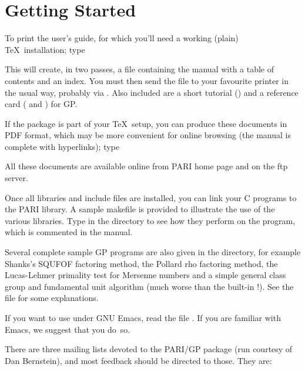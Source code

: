 \section{Getting Started}

 To print the user's guide, for which you'll
need a working (plain) \TeX\ installation; type


\noindent This will create, in two passes, a file 
containing the manual with a table of contents and an index. You must then
send the  file to your favourite printer in the usual way,
probably via . Also included are a short tutorial
() and a reference card (
and ) for GP.

\noindent If the  package is part of your \TeX\ setup, you can
produce these documents in PDF format, which may be more convenient for
online browsing (the manual is complete with hyperlinks); type


\noindent All these documents are available online from PARI home page and on
the  ftp server.

 Once all libraries and include files are installed,
you can link your C programs to the PARI library. A sample makefile
 is provided to illustrate the use of the various
libraries. Type  in the  directory to see how
they perform on the  program, which is commented in the
manual.

 Several complete sample GP programs are also given in
the  directory, for example Shanks's SQUFOF factoring method,
the Pollard rho factoring method, the Lucas-Lehmer primality test for
Mersenne numbers and a simple general class group and fundamental unit
algorithm (much worse than the built-in !). See the file
 for some explanations.

 If you want to use  under GNU Emacs, read the file
. If you are familiar with Emacs, we suggest that
you do~so.

 There are three mailing lists devoted to the
PARI/GP package (run courtesy of Dan Bernstein), and most feedback should be
directed to those. They are:

